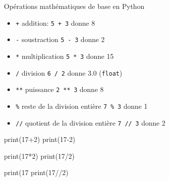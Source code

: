\begin{easybox}{Opérations mathématiques de base en Python}{}
	\begin{minipage}{0.43\linewidth}
		\begin{itemize}[]
        \item[] \texttt{+} \quad  addition:  \verb~5 + 3~ donne 8
        \item[] \texttt{-} \quad  soustraction \verb~5 - 3~ donne 2
        \item[] \texttt{*} \quad  multiplication \verb~5 * 3~ donne 15
        \item[] \texttt{/} \quad  division \verb~6 / 2~ donne 3.0 (\texttt{float})
\end{itemize}
	\end{minipage}\hfill{}
	\begin{minipage}{0.55\linewidth}
\begin{itemize}[]
        \item[] \texttt{**} \quad  puissance \verb~2 ** 3~ donne 8
        \item[] \texttt{\%} \quad  reste de la division entière \texttt{7 \% 3} donne 1
        \item[] \texttt{//} \quad  quotient de la division entière \texttt{7 // 3} donne 2
    \end{itemize}
	\end{minipage}
\end{easybox}

\begin{minipage}{0.3\linewidth}
    \begin{ConsolePythontex}[Label=false]{}
        print(17+2)
        print(17-2)
    \end{ConsolePythontex}
\end{minipage}\hfill
\begin{minipage}{0.3\linewidth}
    \begin{ConsolePythontex}[Label=false]{}
		print(17*2)
		print(17/2)
    \end{ConsolePythontex}
\end{minipage}\hfill
\begin{minipage}{0.3\linewidth}
    \begin{ConsolePythontex}[Label=false]{}
        print(17%
        print(17//2)
    \end{ConsolePythontex}
\end{minipage}

